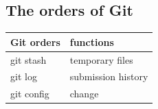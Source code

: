 \documentclass{article}
\begin{document}
\subsection{The orders of Git}

\begin{tabular}{|l|l|}
\hline
Git orders & functions\\
\hline
git stash & temporary files\\
\hline
git log & submission history\\
\hline
git config & change\\
\hline
\end{tabular}
\end{document}
